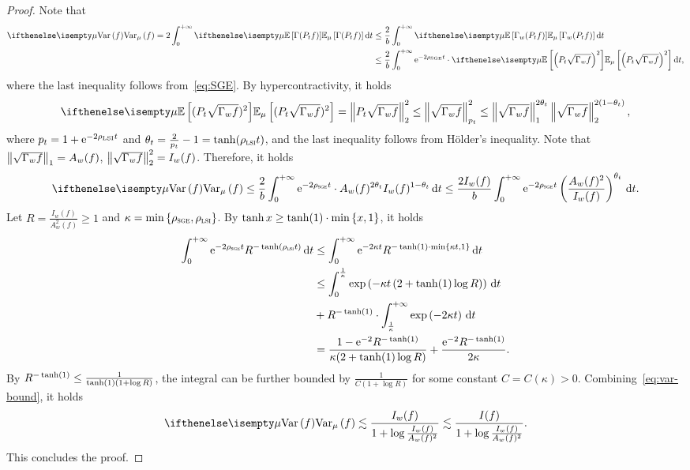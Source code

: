 \begin{proof}
Note that
\begin{align*}
\Var[\mu]{f} = 2 \int_0^{+\infty} \E[\mu]{\Gamma(P_t f)} \dif t &\le \frac{2}{b} \int_0^{+\infty} \E[\mu]{\Gamma_w(P_tf)} \dif t\\
&\le \frac{2}{b} \int_0^{+\infty} \e^{-2 \rho_{\mathrm{SGE}} t} \cdot \E[\mu]{\tp{P_t \sqrt{\Gamma_w f}}^2 } \dif t,
\end{align*}
where the last inequality follows from~\eqref{eq:SGE}. By hypercontractivity, it holds
\begin{align*}
    \E[\mu]{(P_t \sqrt{\Gamma_w f})^2} = \norm{P_t \sqrt{\Gamma_w f}}_2^2 \le \norm{\sqrt{\Gamma_w f}}^2_{p_t} \le \norm{\sqrt{\Gamma_w f}}_{1}^{2 \theta_t} \norm{\sqrt{\Gamma_w f}}_2^{2 (1-\theta_t)},
\end{align*}
where $p_t = 1 + \mathrm{e}^{-2\rho_{\mathrm{LSI}} t}$ and $\theta_t = \frac{2}{p_t} - 1 = \tanh (\rho_{{\normalfont\textsc{lsi}}} t)$, and the last inequality follows from H\"older's inequality.
Note that $\left\lVert \sqrt{\Gamma_w f} \right\rVert_1 = A_w(f)$, $\left\lVert \sqrt{\Gamma_w f} \right\rVert_2^2 = I_w(f)$. Therefore, it holds
\begin{align}\label{eq:var-bound}
    \Var[\mu]{f} \le \frac{2}{b} \int_0^{+\infty} \e^{-2 \rho_{\SGE} t} \cdot A_w(f)^{2 \theta_t} I_w(f)^{1-\theta_t} \dif t \le \frac{2 I_w(f)}{b} \int_0^{+\infty} \e^{-2 \rho_{\SGE} t} \tp{\frac{A_w(f)^2}{I_w(f)}}^{\theta_t} \dif t.
\end{align}
Let $R = \frac{I_w(f)}{A^2_w(f)} \ge 1$ and $\kappa = \min\left\{\rho_{{\normalfont\textsc{sge}}},\rho_{{\normalfont\textsc{lsi}}}\right\}$. By $\tanh x \ge \tanh(1) \cdot \min\left\{x,1\right\}$, it holds
\begin{align*}
\int_0^{+\infty} \mathrm{e}^{-2 \rho_{{\normalfont\textsc{sge}}} t} R^{-\tanh(\rho_{{\normalfont\textsc{lsi}}} t)} \,\mathrm{d} t &\le \int_0^{+\infty} \mathrm{e}^{-2 \kappa t} R^{-\tanh(1) \cdot \min\left\{\kappa t, 1\right\}} \,\mathrm{d} t\\
&\le \int_0^{\frac{1}{\kappa}} \exp\left(- \kappa t \left(2 + \tanh (1) \log R\right)\right) \,\mathrm{d} t\\
&+ R^{-\tanh(1)} \cdot \int_{\frac{1}{\kappa}}^{+\infty} \exp\left(-2\kappa t\right) \,\mathrm{d} t\\
&= \frac{1-\mathrm{e}^{-2}R^{-\tanh(1)}}{\kappa (2+\tanh(1) \log R)} + \frac{\mathrm{e}^{-2} R^{-\tanh (1)}}{2 \kappa}.
\end{align*}
By $R^{-\tanh(1)} \le \frac{1}{\tanh(1)\left(1+\log R\right)}$, the integral can be further bounded by $\frac{1}{C(1+\log R)}$ for some constant $C = C(\kappa) > 0$. Combining~\eqref{eq:var-bound}, it holds
\begin{align*}
\Var[\mu]{f} \lesssim \frac{I_w(f)}{1+\log \frac{I_w(f)}{A_w(f)^2}} \lesssim  \frac{I(f)}{1+\log \frac{I_w(f)}{A_w(f)^2}}.
\end{align*}
This concludes the proof.
\end{proof}

